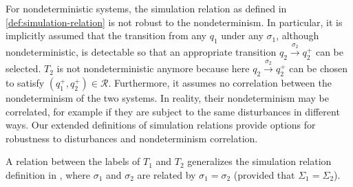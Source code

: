 \begin{remark}
  For nondeterministic systems, the simulation relation as defined in
  \cref{def:simulation-relation} is not robust to the
  nondeterminism. In particular, it is implicitly assumed that the transition
  from any $q_1$ under any $\sigma_1$, although nondeterministic, is
  detectable so that an appropriate transition $q_2 \xrightarrow{\sigma_2}
  q^+_2$ can be selected. $T_2$ is not nondeterministic anymore because here
  $q_2 \xrightarrow{\sigma_2} q^+_2$ can be chosen to satisfy $(q_1^+, q_2^+)
  \in \mathcal{R}$. Furthermore, it assumes no correlation between the
  nondeterminism of the two systems. In reality, their nondeterminism may be
  correlated, for example if they are subject to the same disturbances in
  different ways. Our extended definitions of simulation relations provide
  options for robustness to disturbances and nondeterminism correlation.
\end{remark}

\begin{remark}
  A relation between the labels of $T_1$ and $T_2$ generalizes the simulation
  relation definition in {\cite{girardetal07amd}}, where $\sigma_1$ and
  $\sigma_2$ are related by $\sigma_1 = \sigma_2$ (provided that $\Sigma_1 =
  \Sigma_2$).
\end{remark}

